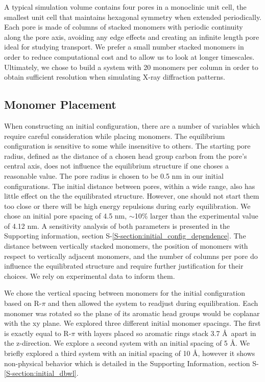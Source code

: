 \documentclass[journal=jpcbfk,manusciprt=article]{achemso}
\begin{document}
  A typical simulation volume contains four pores in a monoclinic unit cell,
  the smallest unit cell that maintains hexagonal symmetry when extended
  periodically. Each pore is made of columns of stacked monomers with periodic
  continuity along the pore axis, avoiding any edge effects and creating an
  infinite length pore ideal for studying transport. We prefer a small number stacked
  monomers in order to reduce computational cost and to allow us to look at
  longer timescales. Ultimately, we chose to build a system with 20 monomers
  per column in order to obtain sufficient resolution when simulating
  X-ray diffraction patterns. %

  \subsection{Monomer Placement} 

  When constructing an initial configuration, there are a number of variables
  which require careful consideration while placing monomers. The equilibrium
  configuration is sensitive to some while insensitive to others. The starting
  pore radius, defined as the distance of a chosen head group carbon from the
  pore's central axis, does not influence the equilibrium structure if one choses
  a reasonable value. The pore radius is chosen to be 0.5 nm in our initial
  configurations. The initial distance between pores, within a wide range, also has 
  little effect on the the equilibrated structure. However, one should not start them
  too close or there will be high energy repulsions during early equilibration. We 
  chose an initial pore spacing of 4.5 nm, $\sim$10\% larger than the experimental value
  of 4.12 nm. A sensitivity analysis of both parameters is presented in the 
  Supporting information, section S-\ref{S-section:initial_config_dependence}. The 
  distance between vertically stacked monomers, the position of monomers with respect 
  to vertically adjacent monomers, and the number of columns per pore do influence the 
  equilibrated structure and require further justification for their choices. We rely on 
  experimental data to inform them. 

  We chose the vertical spacing between monomers for the initial configuration based
  on R-$\pi$ and then allowed the system to readjust during equilibration. Each monomer was
  rotated so the plane of its aromatic head groups would be coplanar with the xy plane. We
  explored three different initial monomer spacings. The first is exactly
  equal to R-$\pi$ with layers placed so aromatic rings stack 3.7 \AA~apart in
  the z-direction. We explore a second system with an initial spacing of 5
  \AA. We briefly explored a third system with an initial spacing of 10
  \AA, however it shows non-physical behavior which is detailed in the 
  Supporting Information, section S-\ref{S-section:initial_dbwl}. 
\end{document}
